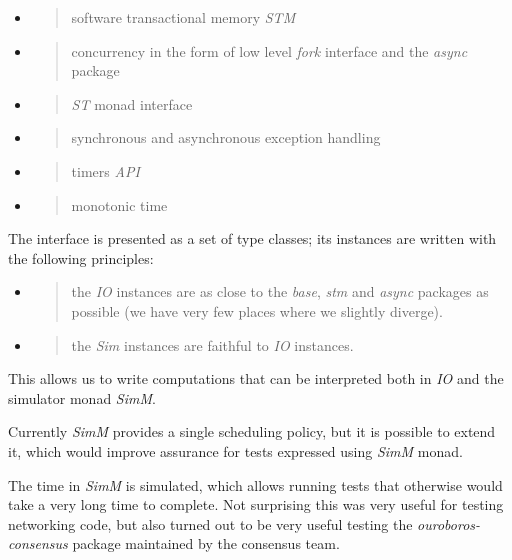 \documentclass[11pt,a4paper]{article}
\begin{document}
\begin{itemize}
\item
  \begin{quote}
  software transactional memory \emph{STM}
  \end{quote}
\item
  \begin{quote}
  concurrency in the form of low level \emph{fork} interface and the
  \emph{async} package
  \end{quote}
\item
  \begin{quote}
  \emph{ST} monad interface
  \end{quote}
\item
  \begin{quote}
  synchronous and asynchronous exception handling
  \end{quote}
\item
  \begin{quote}
  timers \emph{API}
  \end{quote}
\item
  \begin{quote}
  monotonic time
  \end{quote}
\end{itemize}

The interface is presented as a set of type classes; its instances are
written with the following principles:

\begin{itemize}
\item
  \begin{quote}
  the \emph{IO} instances are as close to the \emph{base}, \emph{stm}
  and \emph{async} packages as possible (we have very few places where
  we slightly diverge).
  \end{quote}
\item
  \begin{quote}
  the \emph{Sim} instances are faithful to \emph{IO} instances.
  \end{quote}
\end{itemize}

This allows us to write computations that can be interpreted both in
\emph{IO} and the simulator monad \emph{SimM}.

Currently \emph{SimM} provides a single scheduling policy, but it is
possible to extend it, which would improve assurance for tests expressed
using \emph{SimM} monad.

The time in \emph{SimM} is simulated, which allows running tests that
otherwise would take a very long time to complete. Not surprising this
was very useful for testing networking code, but also turned out to be
very useful testing the \emph{ouroboros-consensus} package maintained by
the consensus team.
\end{document}
